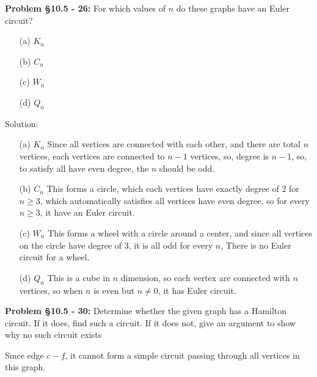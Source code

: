 \documentclass{article}
\newenvironment{problem}[1]
{\begin{mdframed}[default]
\textbf{Problem #1:}
}
{\end{mdframed}
}
\begin{document}
\begin{problem}{\S 10.5 - 26} For which values of $n$ do these graphs have an Euler
circuit?
\begin{enumerate}
\item[(a)] $K_n$
\item[(b)] $C_n$
\item[(c)] $W_n$
\item[(d)] $Q_n$
\end{enumerate}
Solution:
\begin{enumerate}
\item[(a)] $K_n$ Since all vertices are connected with each other, and there are total $n$ vertices, each vertices are connected to $n-1$ vertices, so, degree is $n-1$, so, to satisfy all have even degree, the $n$ should be odd.
\item[(b)] $C_n$ This forms a circle, which each vertices have exactly degree of 2 for $n\geq 3$, which automatically satisfies all vertices have even degree, so for every $n\geq 3$, it have an Euler circuit.
\item[(c)] $W_n$ This forms a wheel with a circle around a center, and since all vertices on the circle have degree of 3, it is all odd for every $n$, There is no Euler circuit for a wheel.
\item[(d)] $Q_n$ This is a cube in $n$ dimension, so each vertex are connected with $n$ vertices, so when $n$ is even but $n \neq 0$, it has Euler circuit.
\end{enumerate}
\end{problem}
\begin{problem}{\S 10.5 - 30} Determine whether the given graph has a
Hamilton circuit. If it does, find such a circuit. If it does not,
give an argument to show why no such circuit exists
\begin{center}
\end{center}
Since edge $c-f$, it cannot form a simple circuit passing through all vertices in this graph.
\end{problem}
\end{document}
